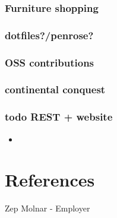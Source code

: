 \documentclass{article}
\begin{document}
\subsubsection{Furniture shopping}

\subsubsection{dotfiles?/penrose?}

\subsubsection{OSS contributions}

\subsubsection{continental conquest}

\subsubsection{todo REST + website}


\begin{itemize}
\item
\end{itemize}

\section{References}

Zep Molnar - Employer
\end{document}
